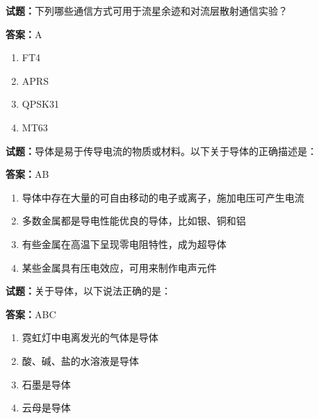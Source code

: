 \documentclass{ctexbook}
\begin{document}
\textbf{试题：}下列哪些通信方式可用于流星余迹和对流层散射通信实验？ 

\textbf{答案：}A 

\begin{enumerate}[leftmargin=3em]
  \item FT4 

  \item APRS 

  \item QPSK31 

  \item MT63 

\end{enumerate}





\vspace{1em}

\textbf{试题：}导体是易于传导电流的物质或材料。以下关于导体的正确描述是： 

\textbf{答案：}AB 

\begin{enumerate}[leftmargin=3em]
  \item 导体中存在大量的可自由移动的电子或离子，施加电压可产生电流 

  \item 多数金属都是导电性能优良的导体，比如银、铜和铝 

  \item 有些金属在高温下呈现零电阻特性，成为超导体 

  \item 某些金属具有压电效应，可用来制作电声元件 

\end{enumerate}





\vspace{1em}

\textbf{试题：}关于导体，以下说法正确的是： 

\textbf{答案：}ABC 

\begin{enumerate}[leftmargin=3em]
  \item 霓虹灯中电离发光的气体是导体 

  \item 酸、碱、盐的水溶液是导体 

  \item 石墨是导体 

  \item 云母是导体 

\end{enumerate}
\end{document}
